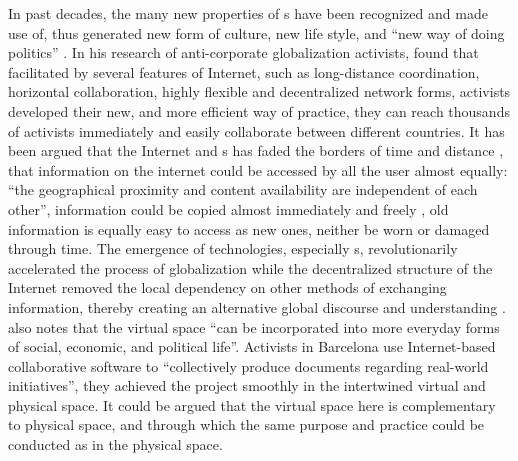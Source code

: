 In past decades, the many new properties of \ict s have been recognized and made use of, thus generated new form of culture, new life style, and ``new way of doing politics'' \citep[p.~198]{juris_new_2005}. In his research of anti-corporate globalization activists, \citeauthor{juris_new_2005} found that facilitated by several features of Internet, such as long-distance coordination, horizontal collaboration, highly flexible and decentralized network forms, activists developed their new, and more efficient way of practice, they can reach thousands of activists immediately and easily collaborate between different countries. It has been argued that the Internet and \ict s has faded the borders of time and distance \citep{juris_new_2005,harlow_collective_2012}, that information on the internet could be accessed by all the user almost equally: ``the geographical proximity and content availability are independent of each other'', information could be copied almost immediately and freely \citep[p.~179]{boyle_foucault_1997}, old information is equally easy to access as new ones, neither be worn or damaged through time. The emergence of technologies, especially \ict s, revolutionarily accelerated the process of globalization while the decentralized structure of the Internet removed the local dependency on other methods of exchanging information, thereby creating an alternative global discourse and understanding \citep{chadwick_internet_2006,dencik_alternative_2013}.  \citet[p.~205]{juris_new_2005} also notes that the virtual space ``can be incorporated into more everyday forms of social, economic, and political life''. Activists in Barcelona use Internet-based collaborative software to ``collectively produce documents regarding real-world initiatives'', they achieved the project smoothly in the intertwined virtual and physical space. It could be argued that the virtual space here is complementary to physical space, and through which the same purpose and practice could be conducted as in the physical space.

